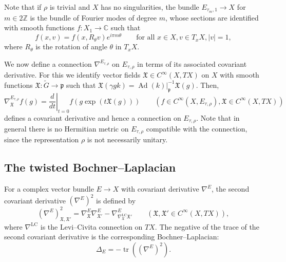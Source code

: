 \documentclass[JEP,XML,SOM,Unicode,NoFloatCountersInSection,published]{cedram}
\theoremstyle{plain}
\theoremstyle{definition}
\theoremstyle{remark}
\newcommand{\Z}{\mathbb{Z}}
\newcommand{\C}{\mathbb{C}}
\DeclareMathOperator{\tr}{tr}
\DeclareMathOperator{\Ad}{Ad}
\numberwithin{equation}{section}
\begin{document}
Note that if $\rho$ is trivial and $X$ has no singularities, the bundle $E_{\tau_m,1}\to X$ for $m\in2\Z$ is the bundle of Fourier modes of degree $m$, whose sections are identified with smooth functions $f : X_1 \to \C$ such that
\[
f(x,v) = f (x,R_\theta v)e^{i\pi m\theta} \qquad \mbox{for all }x\in X,v\in T_xX,|v|=1,
\]
where $R_\theta$ is the rotation of angle $\theta$ in $T_xX$.

We now define a connection $\nabla^{E_{\tau,\rho}}$ on $E_{\tau,\rho}$ in terms of its associated covariant derivative. For this we identify vector fields $\mathfrak X\in C^\infty(X,TX)$ on $X$ with smooth functions $\mathfrak X:\widetilde{G}\to\mathfrak{p}$ such that $\mathfrak X(\gamma gk)=\Ad(k)|_{\mathfrak{p}}^{-1}\mathfrak X(g)$. Then,
\[
\nabla^{E_{\tau,\rho}}_{\mathfrak X}f(g) = \left.\frac{d}{dt}\right|_{t=0}f(g\exp(t\mathfrak X(g))) \qquad (f\in C^\infty(X,E_{\tau,\rho}),\mathfrak X\in C^\infty(X,TX))
\]
defines a covariant derivative and hence a connection on $E_{\tau,\rho}$. Note that in general there is no Hermitian metric on $E_{\tau,\rho}$ compatible with the connection, since the representation $\rho$ is not necessarily unitary.

\subsection{The twisted Bochner--Laplacian}
\label{subsec:Laplacians}

For a complex vector bundle $E\to X$ with covariant derivative $\nabla^E$, the second covariant derivative $(\nabla^E)^2$ is defined by
\[
(\nabla^E)^2_{\mathfrak X,\mathfrak X'} = \nabla_{\mathfrak X}^E\nabla_{\mathfrak X'}^E-\nabla^E_{\nabla_{\mathfrak X}^{\operatorname{LC}}\mathfrak X'} \qquad (\mathfrak X,\mathfrak X'\in C^\infty(X,TX)),
\]
where $\nabla^{\operatorname{LC}}$ is the Levi--Civita connection on $TX$.
The negative of the trace of the second covariant derivative is the corresponding Bochner--Laplacian:
\[
\Delta_E = -\tr\left((\nabla^E)^2\right).
\]
\end{document}
